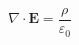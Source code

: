 \documentclass{article}
\begin{document}
\begin{equation}
    \nabla \cdot \mathbf{E} = \frac{\rho}{\varepsilon_0}
\end{equation}
\end{document}
